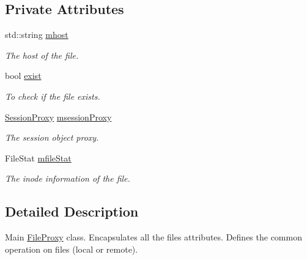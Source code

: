 \subsection*{Private Attributes}
\begin{DoxyCompactItemize}
\item 
\hypertarget{classFileProxy_a1e6cf973d3114c87fdf2d405399bc50f}{
std::string \hyperlink{classFileProxy_a1e6cf973d3114c87fdf2d405399bc50f}{mhost}}
\label{classFileProxy_a1e6cf973d3114c87fdf2d405399bc50f}

\begin{DoxyCompactList}\small\item\em The host of the file. \item\end{DoxyCompactList}\item 
\hypertarget{classFileProxy_a4b0e346c8e0cee89598bb44357703ffa}{
bool \hyperlink{classFileProxy_a4b0e346c8e0cee89598bb44357703ffa}{exist}}
\label{classFileProxy_a4b0e346c8e0cee89598bb44357703ffa}

\begin{DoxyCompactList}\small\item\em To check if the file exists. \item\end{DoxyCompactList}\item 
\hypertarget{classFileProxy_a5e710a1ecc770a0ed775c54601a20563}{
\hyperlink{classSessionProxy}{SessionProxy} \hyperlink{classFileProxy_a5e710a1ecc770a0ed775c54601a20563}{msessionProxy}}
\label{classFileProxy_a5e710a1ecc770a0ed775c54601a20563}

\begin{DoxyCompactList}\small\item\em The session object proxy. \item\end{DoxyCompactList}\item 
\hypertarget{classFileProxy_a661e785a5cb408c60cce534c8b21e64d}{
FileStat \hyperlink{classFileProxy_a661e785a5cb408c60cce534c8b21e64d}{mfileStat}}
\label{classFileProxy_a661e785a5cb408c60cce534c8b21e64d}

\begin{DoxyCompactList}\small\item\em The inode information of the file. \item\end{DoxyCompactList}\end{DoxyCompactItemize}


\subsection{Detailed Description}
Main \hyperlink{classFileProxy}{FileProxy} class. Encapsulates all the files attributes. Defines the common operation on files (local or remote). 

